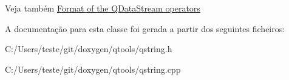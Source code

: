 \begin{DoxySeeAlso}{Veja também}
\hyperlink{}{Format of the Q\-Data\-Stream operators } 
\end{DoxySeeAlso}


A documentação para esta classe foi gerada a partir dos seguintes ficheiros\-:\begin{DoxyCompactItemize}
\item 
C\-:/\-Users/teste/git/doxygen/qtools/qstring.\-h\item 
C\-:/\-Users/teste/git/doxygen/qtools/qstring.\-cpp\end{DoxyCompactItemize}
